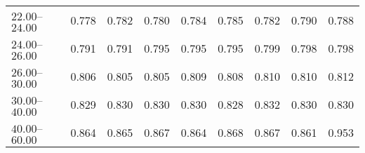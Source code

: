 \begin{table}[htp]
\begin{tiny}
\begin{center}
\begin{tabular}{|l|c|c|c|c|c|c|c|c|}
$22.00$--$24.00$ & 0.778 & 0.782 & 0.780 & 0.784 & 0.785 & 0.782 & 0.790 & 0.788  \\
$24.00$--$26.00$ & 0.791 & 0.791 & 0.795 & 0.795 & 0.795 & 0.799 & 0.798 & 0.798  \\
$26.00$--$30.00$ & 0.806 & 0.805 & 0.805 & 0.809 & 0.808 & 0.810 & 0.810 & 0.812  \\
$30.00$--$40.00$ & 0.829 & 0.830 & 0.830 & 0.830 & 0.828 & 0.832 & 0.830 & 0.830  \\
$40.00$--$60.00$ & 0.864 & 0.865 & 0.867 & 0.864 & 0.868 & 0.867 & 0.861 & 0.953  \\
\hline
\end{tabular} 
             \end{center} 
             \end{tiny} 
             \label{tab:sa_long_psi2s} 
             \end{table}


